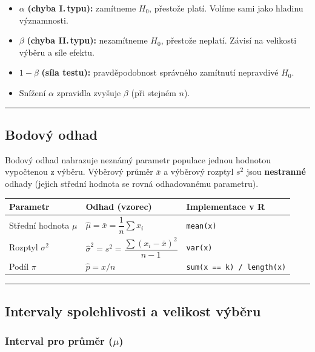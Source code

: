 \documentclass[a4paper, 11pt]{article}
\begin{document}
\medskip
\begin{itemize}[noitemsep]
	\item $\alpha$ \textbf{(chyba I.\,typu):} zamítneme $H_0$, přestože platí. Volíme sami jako hladinu významnosti.
	\item $\beta$ \textbf{(chyba II.\,typu):} nezamítneme $H_0$, přestože neplatí. Závisí na velikosti výběru a síle efektu.
	\item $1-\beta$ \textbf{(síla testu):} pravděpodobnost správného zamítnutí nepravdivé $H_0$.
	\item Snížení $\alpha$ zpravidla zvyšuje $\beta$ (při stejném $n$).
\end{itemize}

\noindent\hrule\medskip

\subsection{Bodový odhad}

Bodový odhad nahrazuje neznámý parametr populace jednou hodnotou
vypočtenou z výběru. Výběrový průměr $\bar{x}$ a výběrový rozptyl $s^2$
jsou \textbf{nestranné} odhady (jejich střední hodnota se rovná odhadovanému parametru).

{\renewcommand{\arraystretch}{1.4}
	\begin{tabular}{p{} p{} p{}}
		\textbf{Parametr}       & \textbf{Odhad (vzorec)}                                   & \textbf{Implementace v R}        \\
		\midrule
		Střední hodnota $\mu$ & $\hat{\mu} = \bar{x} = \dfrac{1}{n}\sum x_i$              & \texttt{mean(x)}                 \\
		Rozptyl $\sigma^2$      & $\hat{\sigma}^2 = s^2 = \dfrac{\sum(x_i-\bar{x})^2}{n-1}$ & \texttt{var(x)}                  \\
		Podíl $\pi$            & $\hat{p} = x/n$                                           & \texttt{sum(x == k) / length(x)} \\
	\end{tabular}}

\noindent\hrule\medskip

\subsection{Intervaly spolehlivosti a velikost výběru}

\subsubsection{Interval pro průměr ($\mu$)}
\end{document}
